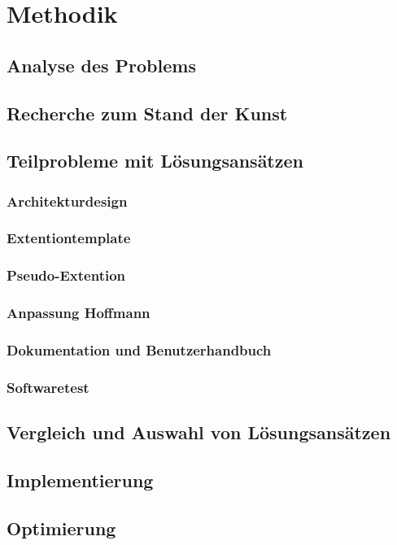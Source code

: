 \chapter{Methodik}
\label{chap:methodik}

\section{Analyse des Problems}

\section{Recherche zum Stand der Kunst}

\section{Teilprobleme mit Lösungsansätzen}
\subsection{Architekturdesign}
\subsection{Extentiontemplate}
\subsection{Pseudo-Extention}
\subsection{Anpassung Hoffmann}
\subsection{Dokumentation und Benutzerhandbuch}
\subsection{Softwaretest}

\section{Vergleich und Auswahl von Lösungsansätzen}

\section{Implementierung}
\section{Optimierung}
